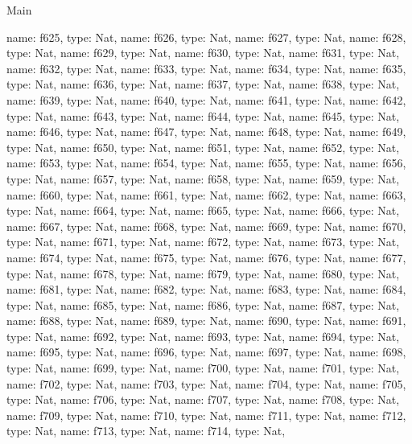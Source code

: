 \begin{lexlean}{Main}
\begin{semanticmodule}
{    {name: f625, type: Nat},
    {name: f626, type: Nat},
    {name: f627, type: Nat},
    {name: f628, type: Nat},
    {name: f629, type: Nat},
    {name: f630, type: Nat},
    {name: f631, type: Nat},
    {name: f632, type: Nat},
    {name: f633, type: Nat},
    {name: f634, type: Nat},
    {name: f635, type: Nat},
    {name: f636, type: Nat},
    {name: f637, type: Nat},
    {name: f638, type: Nat},
    {name: f639, type: Nat},
    {name: f640, type: Nat},
    {name: f641, type: Nat},
    {name: f642, type: Nat},
    {name: f643, type: Nat},
    {name: f644, type: Nat},
    {name: f645, type: Nat},
    {name: f646, type: Nat},
    {name: f647, type: Nat},
    {name: f648, type: Nat},
    {name: f649, type: Nat},
    {name: f650, type: Nat},
    {name: f651, type: Nat},
    {name: f652, type: Nat},
    {name: f653, type: Nat},
    {name: f654, type: Nat},
    {name: f655, type: Nat},
    {name: f656, type: Nat},
    {name: f657, type: Nat},
    {name: f658, type: Nat},
    {name: f659, type: Nat},
    {name: f660, type: Nat},
    {name: f661, type: Nat},
    {name: f662, type: Nat},
    {name: f663, type: Nat},
    {name: f664, type: Nat},
    {name: f665, type: Nat},
    {name: f666, type: Nat},
    {name: f667, type: Nat},
    {name: f668, type: Nat},
    {name: f669, type: Nat},
    {name: f670, type: Nat},
    {name: f671, type: Nat},
    {name: f672, type: Nat},
    {name: f673, type: Nat},
    {name: f674, type: Nat},
    {name: f675, type: Nat},
    {name: f676, type: Nat},
    {name: f677, type: Nat},
    {name: f678, type: Nat},
    {name: f679, type: Nat},
    {name: f680, type: Nat},
    {name: f681, type: Nat},
    {name: f682, type: Nat},
    {name: f683, type: Nat},
    {name: f684, type: Nat},
    {name: f685, type: Nat},
    {name: f686, type: Nat},
    {name: f687, type: Nat},
    {name: f688, type: Nat},
    {name: f689, type: Nat},
    {name: f690, type: Nat},
    {name: f691, type: Nat},
    {name: f692, type: Nat},
    {name: f693, type: Nat},
    {name: f694, type: Nat},
    {name: f695, type: Nat},
    {name: f696, type: Nat},
    {name: f697, type: Nat},
    {name: f698, type: Nat},
    {name: f699, type: Nat},
    {name: f700, type: Nat},
    {name: f701, type: Nat},
    {name: f702, type: Nat},
    {name: f703, type: Nat},
    {name: f704, type: Nat},
    {name: f705, type: Nat},
    {name: f706, type: Nat},
    {name: f707, type: Nat},
    {name: f708, type: Nat},
    {name: f709, type: Nat},
    {name: f710, type: Nat},
    {name: f711, type: Nat},
    {name: f712, type: Nat},
    {name: f713, type: Nat},
    {name: f714, type: Nat},
}
\end{semanticmodule}
\end{lexlean}
